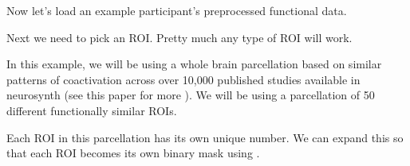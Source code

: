 \documentclass[letterpaper,10pt,english]{sphinxmanual}
\begin{document}
Now let’s load an example participant’s preprocessed functional data.

\begin{sphinxVerbatim}[commandchars=\\\{\}]
  

       \PYG{p}{[}\PYG{p}{]}
  
\end{sphinxVerbatim}

Next we need to pick an ROI. Pretty much any type of ROI will work.

In this example, we will be using a whole brain parcellation based on similar patterns of coactivation across over 10,000 published studies available in neurosynth (see this paper for more ). We will be using a parcellation of 50 different functionally similar ROIs.

\begin{sphinxVerbatim}[commandchars=\\\{\}]
  

\end{sphinxVerbatim}

\noindent{}

Each ROI in this parcellation has its own unique number. We can expand this so that each ROI becomes its own binary mask using .
\end{document}
